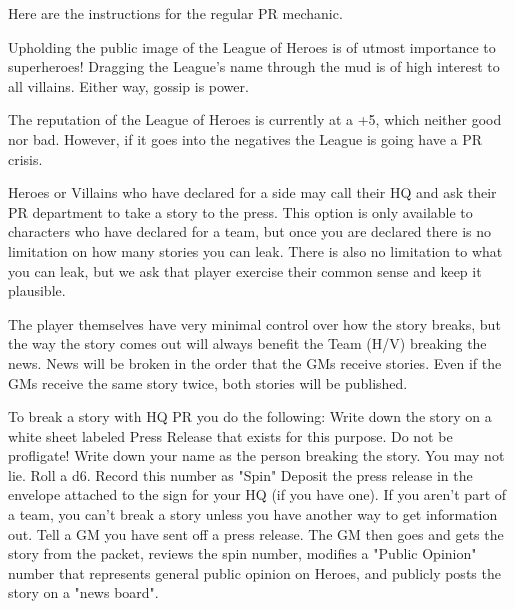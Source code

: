 \documentclass[green]{LRSguildcamp1}
\begin{document}
Here are the instructions for the regular PR mechanic. 

Upholding the public image of the League of Heroes is of utmost importance to superheroes! 
Dragging the League's name through the mud is of high interest to all villains. Either way, gossip is power. 

The reputation of the League of Heroes is currently at a +5, which neither good nor bad. However, if it goes into the negatives the League is going have a PR crisis. 

Heroes or Villains who have declared for a side may call their HQ and ask their PR department to take a story to the press. This option is only available to characters who have declared for a team, but once you are declared there is no limitation on how many stories you can leak. There is also no limitation to what you can leak, but we ask that player exercise their common sense and keep it plausible. 

The player themselves have very minimal control over how the story breaks, but the way the story comes out will always benefit the Team (H/V) breaking the news. News will be broken in the order that the GMs receive stories. Even if the GMs receive the same story twice, both stories will be published. 

To break a story with HQ PR you do the following:
Write down the story on a white sheet labeled Press Release that exists for this purpose. Do not be profligate! 
Write down your name as the person breaking the story. You may not lie. 
Roll a d6. Record this number as "Spin"
Deposit the press release in the envelope attached to the sign for your HQ (if you have one). If you aren't part of a team, you can't break a story unless you have another way to get information out. Tell a GM you have sent off a press release.
The GM then goes and gets the story from the packet, reviews the spin number, modifies a "Public Opinion" number that represents general public opinion on Heroes, and publicly posts the story on a "news board". 
\end{document}
